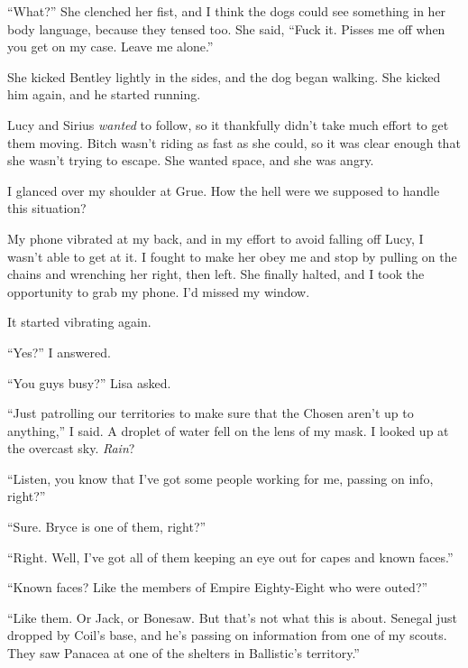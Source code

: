 ``What?''  She clenched her fist, and I think the dogs could see something in her body language, because they tensed too.  She said, ``Fuck it.  Pisses me off when you get on my case.  Leave me alone.''



She kicked Bentley lightly in the sides, and the dog began walking.  She kicked him again, and he started running.



Lucy and Sirius \emph{wanted }to follow, so it thankfully didn't take much effort to get them moving.  Bitch wasn't riding as fast as she could, so it was clear enough that she wasn't trying to escape.  She wanted space, and she was angry.



I glanced over my shoulder at Grue.  How the hell were we supposed to handle this situation?



My phone vibrated at my back, and in my effort to avoid falling off Lucy, I wasn't able to get at it.  I fought to make her obey me and stop by pulling on the chains and wrenching her right, then left.  She finally halted, and I took the opportunity to grab my phone.  I'd missed my window.



It started vibrating again.



``Yes?'' I answered.



``You guys busy?'' Lisa asked.



``Just patrolling our territories to make sure that the Chosen aren't up to anything,'' I said.  A droplet of water fell on the lens of my mask.  I looked up at the overcast sky.  \emph{Rain}?



``Listen, you know that I've got some people working for me, passing on info, right?''



``Sure.  Bryce is one of them, right?''



``Right.  Well, I've got all of them keeping an eye out for capes and known faces.''



``Known faces?  Like the members of Empire Eighty-Eight who were outed?''



``Like them.  Or Jack, or Bonesaw.  But that's not what this is about.  Senegal just dropped by Coil's base, and he's passing on information from one of my scouts.  They saw Panacea at one of the shelters in Ballistic's territory.''



